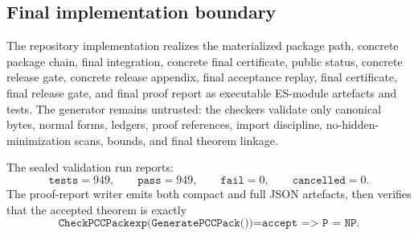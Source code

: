 \documentclass[10.5pt,a4paper]{article}
\begin{document}
\subsection{Final implementation boundary}
The repository implementation realizes the materialized package path, concrete package chain, final integration, concrete final certificate, public status, concrete release gate, concrete release appendix, final acceptance replay, final certificate, final release gate, and final proof report as executable ES-module artefacts and tests.  The generator remains untrusted: the checkers validate only canonical bytes, normal forms, ledgers, proof references, import discipline, no-hidden-minimization scans, bounds, and final theorem linkage.

The sealed validation run reports:
\[
\texttt{tests}=949,
\qquad
\texttt{pass}=949,
\qquad
\texttt{fail}=0,
\qquad
\texttt{cancelled}=0.
\]
The proof-report writer emits both compact and full JSON artefacts, then verifies that the accepted theorem is exactly
\[
\texttt{CheckPCCPackexp(GeneratePCCPack())=accept => P = NP}.
\]
\end{document}
